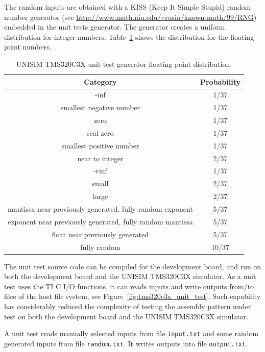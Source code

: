 The random inputs are obtained with a KISS (Keep It Simple Stupid) random number generator (see \url{http://www.math.niu.edu/\~rusin/known-math/99/RNG}) embedded in the unit tests generator.
The generator creates a uniform distribution for integer numbers. 
Table~\ref{table:tms320c3x_unit_test_float_distribution} shows the distribution for the floating point numbers.

\begin{table}[p]
\begin{center}
\begin{tabular}{|c|c|}
\hline
\textbf{Category} & \textbf{Probability}\\
\hline
-inf & 1/37\\
\hline
smallest negative number & 1/37\\
\hline
zero & 1/37\\
\hline
real zero & 1/37\\
\hline
smallest positive number & 1/37\\
\hline
near to integer & 2/37\\
\hline
+inf & 1/37\\
\hline
small & 2/37\\
\hline
large & 2/37\\ 
\hline
mantissa near previously generated, fully random exponent & 5/37\\
\hline
exponent near previously generated, fully random mantissa & 5/37\\
\hline
float near previously generated & 5/37\\
\hline
fully random & 10/37\\
\hline
\end{tabular}
\caption{UNISIM TMS320C3X unit test generator floating point distribution.}
\label{table:tms320c3x_unit_test_float_distribution}
\end{center}
\end{table}

The unit test source code can be compiled for the development board, and run on both the development board and the UNISIM TMS320C3X simulator.
As a unit test uses the TI C I/O functions, it can reads inputs and write outputs from/to files of the host file system, see Figure~\ref{fig:tms320c3x_unit_test}. 
Such capability has considerably reduced the complexity of testing the assembly pattern under test on both the development board and the UNISIM TMS320C3X simulator.

A unit test reads manually selected inputs from file \texttt{input.txt} and some random generated inputs from file \texttt{random.txt}.
It writes outputs into file \texttt{output.txt}.

